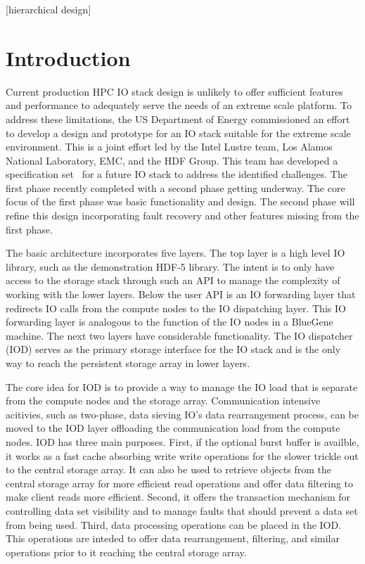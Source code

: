 \documentclass[conference]{sig-alt-gov2}
\begin{document}
[hierarchical design]


\section{Introduction}

Current production HPC IO stack design is unlikely to offer sufficient features
and performance to adequately serve the needs of an extreme scale platform. To
address these limitations, the US Department of Energy commissioned an effort
to develop a design and prototype for an IO stack suitable for the extreme
scale environment. This is a joint effort led by the Intel Lustre team, Los
Alamos National Laboratory, EMC, and the HDF Group. This team has developed a
specification set~\cite{fastforward:2014:docs} for a future IO stack to address
the identified challenges. The first phase recently completed with a second
phase getting underway. The core focus of the first phase was basic
functionality and design. The second phase will refine this design
incorporating fault recovery and other features missing from the first phase.

The basic architecture incorporates five layers. The top layer is a high level
IO library, such as the demonstration HDF-5 library. The intent is to only have
access to the storage stack through such an API to manage the complexity of
working with the lower layers. Below the user API is an IO forwarding layer
that redirects IO calls from the compute nodes to the IO dispatching layer.
This IO forwarding layer is analogous to the function of the IO nodes in a
BlueGene machine. The next two layers have considerable functionality. The IO
dispatcher (IOD) serves as the primary storage interface for the IO stack and
is the only way to reach the persistent storage array in lower layers.

The core idea for IOD is to provide a way to manage the IO load that is
separate from the compute nodes and the storage array. Communication intensive
acitivies, such as two-phase, data sieving IO's data rearrangement process, can
be moved to the IOD layer offloading the communication load from the compute
nodes. IOD has three main purposes. First, if the optional burst buffer is
availble, it works as a fast cache absorbing write write operations for the
slower trickle out to the central storage array. It can also be used to
retrieve objects from the central storage array for more efficient read
operations and offer data filtering to make client reads more efficient.
Second, it offers the transaction mechanism for controlling data set visibility
and to manage faults that should prevent a data set from being used. Third,
data processing operations can be placed in the IOD. This operations are
inteded to offer data rearrangement, filtering, and similar operations prior to
it reaching the central storage array.
\end{document}
